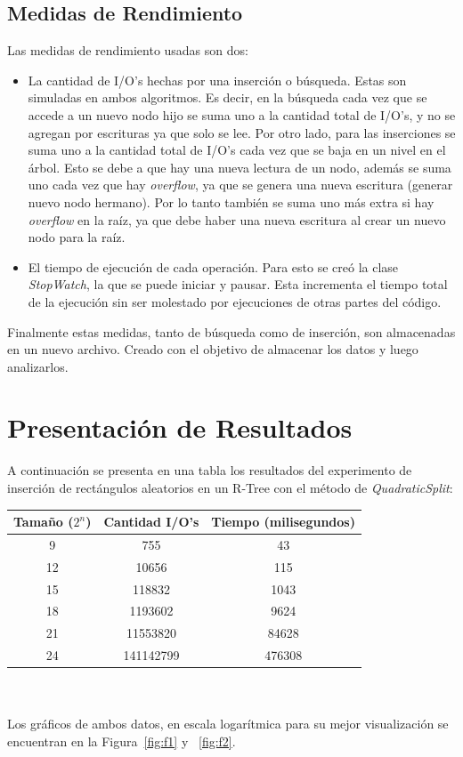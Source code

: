 \documentclass[letterpaper,12pt]{article}
\begin{document}
\subsection{Medidas de Rendimiento}
Las medidas de rendimiento usadas son dos:
\begin{itemize}
\item La cantidad de I/O's hechas por una inserci\'on o b\'usqueda. Estas son simuladas en ambos algoritmos. Es decir, en la b\'usqueda cada vez que se accede a un nuevo nodo hijo se suma uno a la cantidad total de I/O's, y no se agregan por escrituras ya que solo se lee. Por otro lado, para las inserciones se suma uno a la cantidad total de I/O's cada vez que se baja en un nivel en el \'arbol. Esto se debe a que hay una nueva lectura de un nodo, adem\'as se suma uno cada vez que hay \textit{overflow}, ya que se genera una nueva escritura (generar nuevo nodo hermano). Por lo tanto tambi\'en se suma uno m\'as extra si hay \textit{overflow} en la ra\'iz, ya que debe haber una nueva escritura al crear un nuevo nodo para la ra\'iz.
	
\item El tiempo de ejecuci\'on de cada operaci\'on. Para esto se cre\'o la clase \textit{StopWatch}, la que se puede iniciar y pausar. Esta incrementa el tiempo total de la ejecución sin ser molestado por ejecuciones de otras partes del c\'odigo.
\end{itemize}
Finalmente estas medidas, tanto de b\'usqueda como de inserci\'on, son almacenadas en un nuevo archivo. Creado con el objetivo de almacenar los datos y luego analizarlos.

\newpage
\section{Presentaci\'on de Resultados}
A continuaci\'on se presenta en una tabla los resultados del experimento de inserci\'on de rect\'angulos aleatorios en un R-Tree con el m\'etodo de \textit{QuadraticSplit}: \\
\begin{tabular}{|c|c|c|}
\hline
\textbf{Tama\~no ($2^n$)} & \textbf{Cantidad I/O's} & \textbf{Tiempo (milisegundos)} \\
\hline
9 & 755 & 43 \\
\hline
12 & 10656 & 115 \\
\hline
15 & 118832 & 1043 \\
\hline
18 & 1193602 & 9624 \\
\hline
21 & 11553820 & 84628 \\
\hline
24 & 141142799 & 476308 \\
\hline
\end{tabular}
\\ \\
Los gr\'aficos de ambos datos, en escala logar\'itmica para su mejor visualizaci\'on se encuentran en la Figura~\ref{fig:f1} y ~\ref{fig:f2}.
\end{document}
